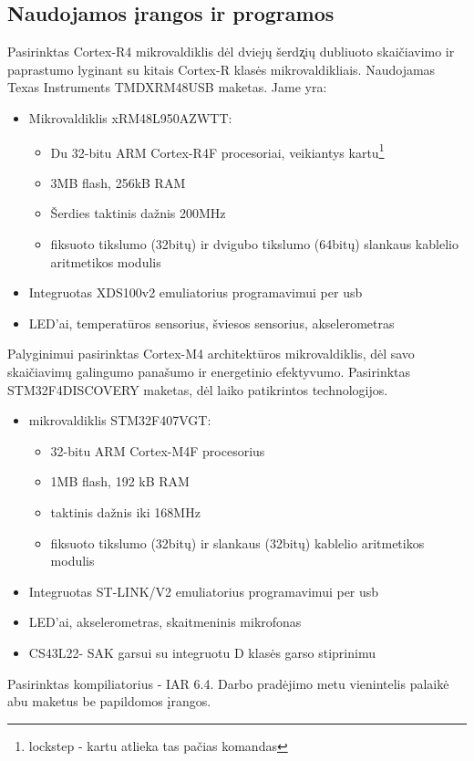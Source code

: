 \documentclass[a4paper, 12pt]{article} %
\begin{document}
\begin{onehalfspacing}

\section{Naudojamos \k{i}rangos ir programos}
Pasirinktas Cortex-R4 mikrovaldiklis d\.{e}l dviej\k{u} \v{s}erd\k{z}i\k{u} dubliuoto skai\v{c}iavimo ir paprastumo lyginant su kitais Cortex-R klas\.{e}s mikrovaldikliais. Naudojamas Texas Instruments TMDXRM48USB maketas. Jame yra:
\begin{itemize}
\item Mikrovaldiklis xRM48L950AZWTT:
\begin{itemize}
\item Du 32-bitu ARM Cortex-R4F procesoriai, veikiantys kartu\footnote{lockstep - kartu atlieka tas pa\v{c}ias komandas}
\item 3MB flash, 256kB RAM
\item \v{S}erdies taktinis da\v{z}nis 200MHz
\item fiksuoto tikslumo (32bit\k{u}) ir dvigubo tikslumo (64bit\k{u}) slankaus kablelio aritmetikos modulis
\end{itemize} 
\item Integruotas XDS100v2 emuliatorius programavimui per usb
\item LED'ai, temperat\=uros sensorius, \v{s}viesos sensorius, akselerometras
\end{itemize}
Palyginimui pasirinktas Cortex-M4 architekt\={u}ros mikrovaldiklis, d\.{e}l savo skai\v{c}iavim\k{u} galingumo pana\v{s}umo ir energetinio efektyvumo. Pasirinktas STM32F4DISCOVERY maketas, d\.{e}l laiko patikrintos technologijos.  
\begin{itemize}
\item mikrovaldiklis STM32F407VGT:
\begin{itemize}
\item 32-bitu ARM Cortex-M4F procesorius
\item 1MB flash, 192 kB RAM 
\item taktinis da\v{z}nis iki 168MHz 
\item fiksuoto tikslumo (32bit\k{u}) ir slankaus (32bit\k{u}) kablelio aritmetikos modulis
\end{itemize}
\item Integruotas ST-LINK/V2 emuliatorius programavimui per usb
\item LED'ai, akselerometras, skaitmeninis mikrofonas
\item CS43L22- SAK garsui su integruotu D klas\.es garso stiprinimu
\end{itemize}
Pasirinktas kompiliatorius - IAR 6.4. Darbo prad\.ejimo metu vienintelis palaik\.e abu maketus be papildomos \k{i}rangos. 

\end{onehalfspacing}
\end{document}
